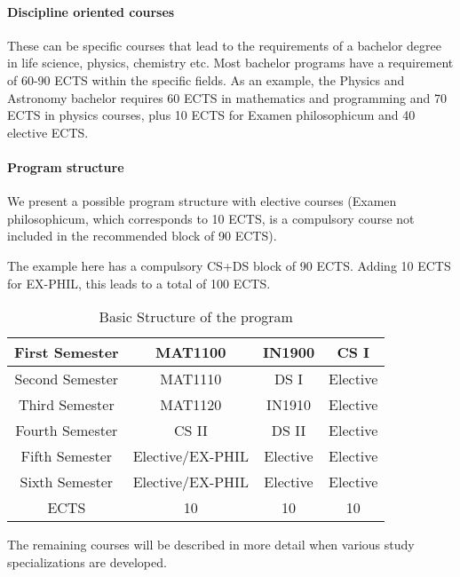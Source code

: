\documentclass[oneside,final,10pt]{article}
\begin{document}
\paragraph{Discipline oriented courses}

These can be specific courses that lead to the requirements of a bachelor degree in life science, physics, chemistry etc. Most bachelor programs have a requirement of 60-90 ECTS within the specific fields. As an example, the Physics and Astronomy bachelor requires 60 ECTS in mathematics and programming and 70 ECTS in physics courses, plus 10 ECTS for Examen philosophicum and 40 elective ECTS.  



\paragraph{Program structure}
We present a possible program structure with elective courses (Examen philosophicum, which corresponds to 10 ECTS, is a compulsory course not included in the recommended block of 90 ECTS).

The example here has a compulsory CS+DS block of 90 ECTS. Adding 10 ECTS for EX-PHIL, this leads to a total of 100 ECTS. 

\begin{table}[hbtp]
 \caption{Basic Structure of the program}
    \centering
    \begin{tabular}{|c|c|c|c|} \hline
    First Semester & MAT1100 &  IN1900   & CS I  \\ \hline 
    Second Semester & MAT1110 &  DS I   & Elective \\ \hline
    Third Semester & MAT1120 &  IN1910   &  Elective\\ \hline
    Fourth Semester & CS II & DS II    & Elective \\ \hline       
    Fifth Semester & Elective/EX-PHIL & Elective     & Elective \\ \hline
    Sixth Semester & Elective/EX-PHIL & Elective    & Elective \\ \hline
   ECTS & 10 &  10   &  10  \\ \hline    
    \end{tabular}
  
The remaining courses will be described in more detail when various study specializations are developed.   
\end{table}
\end{document}
